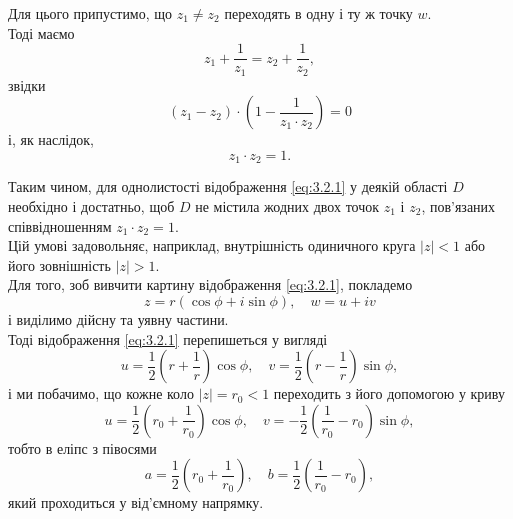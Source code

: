 Для цього припустимо, що $z_1 \ne z_2$ переходять в одну і ту ж точку $w$. \\

Тоді маємо
\begin{equation}
	\label{eq:3.2.2}
	z_1 + \frac{1}{z_1} = z_2 + \dfrac{1}{z_2},
\end{equation}
звідки
\begin{equation}
	\label{eq:3.2.3}
	(z_1 - z_2) \cdot \left( 1 - \dfrac{1}{z_1 \cdot z_2} \right) = 0
\end{equation}
і, як наслідок,
\begin{equation}
	\label{eq:3.2.4}
	z_1 \cdot z_2 = 1.
\end{equation}

Таким чином, для однолистості відображення \eqref{eq:3.2.1} у деякій області $D$ необхідно і достатньо, щоб $D$ не містила жодних двох точок $z_1$ і $z_2$, пов'язаних співвідношенням $z_1 \cdot z_2 = 1$. \\

Цій умові задовольняє, наприклад, внутрішність одиничного круга $|z| < 1$ або його зовнішність $|z| > 1$. \\

Для того, зоб вивчити картину відображення \eqref{eq:3.2.1}, покладемо 
\begin{equation}
	\label{eq:3.2.5}
	z = r \left( \cos \phi + i \sin \phi \right), \quad w = u + i v
\end{equation}
і виділимо дійсну та уявну частини. \\

Тоді відображення \eqref{eq:3.2.1} перепишеться у вигляді
\begin{equation}
	\label{eq:3.2.6}
	u = \dfrac 12 \left( r + \dfrac 1r \right) \cos \phi, \quad v = \dfrac 12 \left( r - \dfrac 1r \right) \sin \phi,
\end{equation}
і ми побачимо, що кожне коло $|z| = r_0 < 1$ переходить з його допомогою у криву
\begin{equation}
	\label{eq:3.2.7}
	u = \dfrac 12 \left( r_0 + \dfrac{1}{r_0} \right) \cos \phi, \quad v = - \dfrac 12 \left( \dfrac{1}{r_0} - r_0 \right) \sin \phi,
\end{equation}
тобто в еліпс з півосями 
\begin{equation}
	\label{eq:3.2.8}
	a = \dfrac 12 \left( r_0 + \dfrac{1}{r_0} \right), \quad b = \dfrac 12 \left( \dfrac{1}{r_0} - r_0 \right),
\end{equation}
який проходиться у від'ємному напрямку. \\

